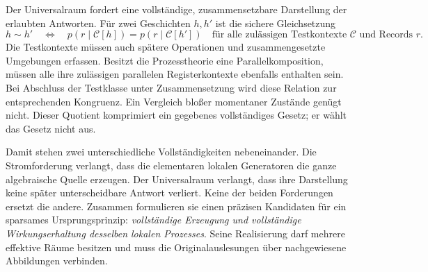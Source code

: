 Der Universalraum fordert eine vollständige, zusammensetzbare Darstellung der erlaubten Antworten. Für zwei Geschichten $h,h'$ ist die sichere Gleichsetzung
\[
 h\sim h'\quad\Longleftrightarrow\quad
 p(r\mid\mathcal C[h])=p(r\mid\mathcal C[h'])
 \quad\text{für alle zulässigen Testkontexte $\mathcal C$ und Records $r$}.
\]
Die Testkontexte müssen auch spätere Operationen und zusammengesetzte Umgebungen erfassen. Besitzt die Prozesstheorie eine Parallelkomposition, müssen alle ihre zulässigen parallelen Registerkontexte ebenfalls enthalten sein. Bei Abschluss der Testklasse unter Zusammensetzung wird diese Relation zur entsprechenden Kongruenz. Ein Vergleich bloßer momentaner Zustände genügt nicht. Dieser Quotient komprimiert ein gegebenes vollständiges Gesetz; er wählt das Gesetz nicht aus.

Damit stehen zwei unterschiedliche Vollständigkeiten nebeneinander. Die Stromforderung verlangt, dass die elementaren lokalen Generatoren die ganze algebraische Quelle erzeugen. Der Universalraum verlangt, dass ihre Darstellung keine später unterscheidbare Antwort verliert. Keine der beiden Forderungen ersetzt die andere. Zusammen formulieren sie einen präzisen Kandidaten für ein sparsames Ursprungsprinzip: \emph{vollständige Erzeugung und vollständige Wirkungserhaltung desselben lokalen Prozesses}. Seine Realisierung darf mehrere effektive Räume besitzen und muss die Originalauslesungen über nachgewiesene Abbildungen verbinden.

\begin{center}
\end{center}

